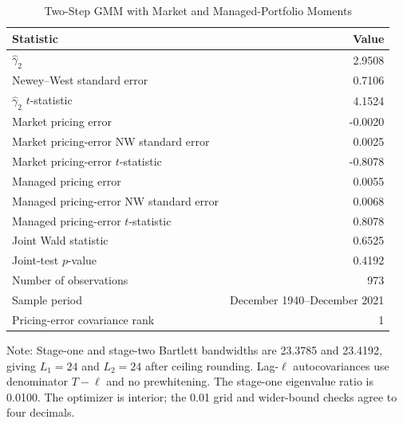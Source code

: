 \begin{table}[H]
  \centering
  \caption{Two-Step GMM with Market and Managed-Portfolio Moments}
  \label{tab:3d-gmm}
  \begin{tabular}{lr}
    \toprule
    Statistic & Value \\
    \midrule
    $\hat{\gamma}_2$ & 2.9508 \\
    Newey--West standard error & 0.7106 \\
    $\hat{\gamma}_2$ $t$-statistic & 4.1524 \\
    Market pricing error & -0.0020 \\
    Market pricing-error NW standard error & 0.0025 \\
    Market pricing-error $t$-statistic & -0.8078 \\
    Managed pricing error & 0.0055 \\
    Managed pricing-error NW standard error & 0.0068 \\
    Managed pricing-error $t$-statistic & 0.8078 \\
    Joint Wald statistic & 0.6525 \\
    Joint-test $p$-value & 0.4192 \\
    Number of observations & 973 \\
    Sample period & December 1940--December 2021 \\
    Pricing-error covariance rank & 1 \\
    \bottomrule
  \end{tabular}
  \footnotesize{Note: Stage-one and stage-two Bartlett bandwidths are 23.3785 and 23.4192, giving $L_1=24$ and $L_2=24$ after ceiling rounding. Lag-$\ell$ autocovariances use denominator $T-\ell$ and no prewhitening. The stage-one eigenvalue ratio is 0.0100. The optimizer is interior; the 0.01 grid and wider-bound checks agree to four decimals.}
\end{table}
